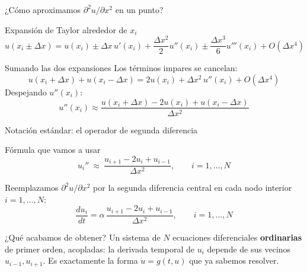 \documentclass[aspectratio=169,12pt]{beamer}
\begin{document}
\begin{frame}{¿Cómo aproximamos $\partial^2 u/\partial x^2$ en un punto?}
	\begin{defbox}{Expansión de Taylor alrededor de $x_i$}
		\[
		u(x_i\pm\Delta x) = u(x_i) \pm \Delta x\,u'(x_i) + \frac{\Delta x^2}{2}u''(x_i) \pm \frac{\Delta x^3}{6}u'''(x_i) + O(\Delta x^4)
		\]
	\end{defbox}
	
	\vspace{4pt}
	\begin{resultbox}{Sumando las dos expansiones}
		Los términos impares se cancelan:
		\[
		u(x_i+\Delta x) + u(x_i-\Delta x) = 2u(x_i) + \Delta x^2\,u''(x_i) + O(\Delta x^4)
		\]
		Despejando $u''(x_i)$:
		\[
		u''(x_i) \approx \frac{u(x_i+\Delta x) - 2u(x_i) + u(x_i-\Delta x)}{\Delta x^2}
		\]
	\end{resultbox}
	
\end{frame}

\begin{frame}{Notación estándar: el operador de segunda diferencia}
	\begin{resultbox}{Fórmula que vamos a usar}
		\[
		u_i''\ \approx\ \frac{u_{i+1} - 2u_i + u_{i-1}}{\Delta x^2}, \qquad i=1,\ldots,N
		\]
	\end{resultbox}
	
	Reemplazamos $\partial^2 u/\partial x^2$ por la segunda diferencia central en cada nodo interior $i=1,\ldots,N$:
	\[
	\frac{du_i}{dt} = \alpha\,\frac{u_{i+1} - 2u_i + u_{i-1}}{\Delta x^2}, \qquad i=1,\ldots,N
	\]
	
	\vspace{4pt}
	\begin{obsbox}{¿Qué acabamos de obtener?}
		Un sistema de $N$ ecuaciones diferenciales \textbf{ordinarias} de primer orden, acopladas: la derivada temporal de $u_i$ depende de sus vecinos $u_{i-1}, u_{i+1}$. Es exactamente la forma $\dot u = g(t,u)$ que ya sabemos resolver.
	\end{obsbox}
\end{frame}
\end{document}
